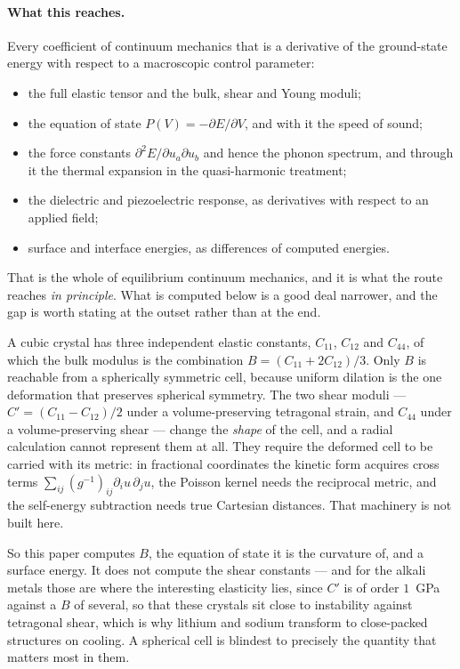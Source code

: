 \documentclass[11pt]{article}
\begin{document}
\paragraph{What this reaches.} Every coefficient of continuum mechanics that is a derivative of the
ground-state energy with respect to a macroscopic control parameter:
\begin{itemize}\itemsep2pt
\item the full elastic tensor and the bulk, shear and Young moduli;
\item the equation of state $P(V)=-\partial E/\partial V$, and with it the speed of sound;
\item the force constants $\partial^2E/\partial u_a\partial u_b$ and hence the phonon spectrum,
  and through it the thermal expansion in the quasi-harmonic treatment;
\item the dielectric and piezoelectric response, as derivatives with respect to an applied field;
\item surface and interface energies, as differences of computed energies.
\end{itemize}
That is the whole of equilibrium continuum mechanics, and it is what the route reaches \emph{in
principle}. What is computed below is a good deal narrower, and the gap is worth stating at the
outset rather than at the end.

A cubic crystal has three independent elastic constants, $C_{11}$, $C_{12}$ and $C_{44}$, of which
the bulk modulus is the combination $B=(C_{11}+2C_{12})/3$. Only $B$ is reachable from a spherically
symmetric cell, because uniform dilation is the one deformation that preserves spherical symmetry.
The two shear moduli --- $C'=(C_{11}-C_{12})/2$ under a volume-preserving tetragonal strain, and
$C_{44}$ under a volume-preserving shear --- change the \emph{shape} of the cell, and a radial
calculation cannot represent them at all. They require the deformed cell to be carried with its
metric: in fractional coordinates the kinetic form acquires cross terms
$\sum_{ij}(g^{-1})_{ij}\partial_iu\,\partial_ju$, the Poisson kernel needs the reciprocal metric,
and the self-energy subtraction needs true Cartesian distances. That machinery is not built here.

So this paper computes $B$, the equation of state it is the curvature of, and a surface energy. It
does not compute the shear constants --- and for the alkali metals those are where the interesting
elasticity lies, since $C'$ is of order $1$~GPa against a $B$ of several, so that these crystals sit
close to instability against tetragonal shear, which is why lithium and sodium transform to
close-packed structures on cooling. A spherical cell is blindest to precisely the quantity that
matters most in them.
\end{document}
